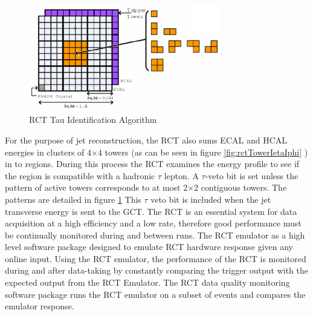 \begin{figure}[hb]
  \centering
	\includegraphics[width=0.75\textwidth]{images/RCTTauAlgo.png}
  	\caption[RCT Tau ID Algorithm]
   	{RCT Tau Identification Algorithm}
	\label{fig:RCTTauAlgo}
\end{figure}
For the purpose of jet reconstruction, the RCT also sums ECAL and HCAL 
energies in clusters of 4$\times$4 towers (as can be seen in figure \ref{fig:rctTowerIetaIphi}
) in to regions. During this process the RCT examines the
energy profile to see if the region is compatible with a hadronic $\tau$ lepton.
A $\tau$-veto bit is set unless the pattern of active towers corresponds to at
most 2$\times$2 contiguous towers. The patterns are detailed in figure \ref{fig:RCTTauAlgo}
This $\tau$ veto bit is included when the jet transverse energy is sent to the GCT.
The RCT is an essential system for data acquisition at a high efficiency and
a low rate, therefore good performance must be continually monitored during and
between runs. The RCT emulator as a high level software package designed
to emulate RCT hardware response given any online input. 
Using the RCT emulator, the performance of the RCT is monitored during 
and after data-taking by constantly comparing the trigger 
output with the expected output from the RCT Emulator. The RCT data quality monitoring 
software package runs the RCT emulator on a subset of events and compares
the emulator response. %

